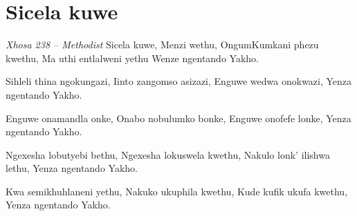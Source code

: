 \starttocol
\chapter{Sicela kuwe}
\nexttocol
\hfill{\it Xhosa 238 -- Methodist}
\stoptocol
\starttocol
\startlines
{\sc Sicela} kuwe, Menzi wethu,
OngumKumkani phezu kwethu,
Ma uthi entlalweni yethu
Wenze ngentando Yakho.

Sihleli thina ngokungazi,
Iinto zangomso asizazi,
Enguwe wedwa onokwazi,
Yenza ngentando Yakho.

Enguwe onamandla onke,
Onabo nobulumko bonke,
Enguwe onofefe lonke,
Yenza ngentando Yakho.

Ngexesha lobutyebi bethu,
Ngexesha lokuswela kwethu,
Nakulo lonk' ilishwa lethu,
Yenza ngentando Yakho.

Kwa semikhuhlaneni yethu,
Nakuko ukuphila kwethu,
Kude kufik ukufa kwethu,
Yenza ngentando Yakho.

\stoplines
\nexttocol

\stoptocol

